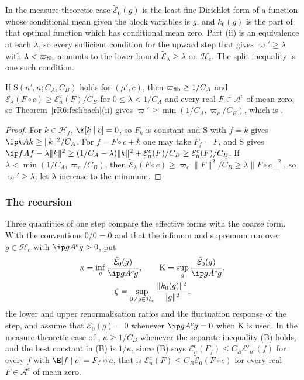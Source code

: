 In the measure-theoretic case $\tilde{\mathcal E}_0(g)$ is the least fine
Dirichlet form of a function whose conditional mean given the block
variables is $g$, and $k_0(g)$ is the part of that optimal function which
has conditional mean zero. Part (ii) is an equivalence at each $\lambda$, so
every sufficient condition for the upward step that gives $\varpi'\ge
\lambda$ with $\lambda<\varpi_{\rm fib}$ amounts to the lower bound
$\tilde{\mathcal E}_\lambda\ge\lambda$ on $\mathcal H_c$. The split
inequality is one such condition.

\begin{proposition}\label{rR6:split}
If $\mathrm S(n',n;C_A,C_B)$ holds for $(\mu',c)$, then $\varpi_{\rm fib}
\ge1/C_A$ and $\tilde{\mathcal E}_\lambda(F\circ c)\ge\mathcal E^c_n(F)/
C_B$ for $0\le\lambda<1/C_A$ and every real $F\in\mathcal A^c$ of mean zero;
so Theorem~\textup{\ref{rR6:feshbach}(ii)} gives $\varpi'\ge\min(1/C_A,
\varpi_c/C_B)$, which is \cite[Theorem~100(i)]{BBLR26}.
\end{proposition}

\begin{proof}
For $k\in\mathcal H_f$, $\E[k\mid c]=0$, so $F_k$ is constant and
$\mathrm S$ with $f=k$ gives $\ip kAk\ge\lVert k\rVert^2/C_A$. For $f=
F\circ c+k$ one may take $F_f=F$, and $\mathrm S$ gives
$\ip fAf-\lambda\lVert k\rVert^2\ge(1/C_A-\lambda)\lVert k\rVert^2+
\mathcal E^c_n(F)/C_B\ge\mathcal E^c_n(F)/C_B$. If $\lambda<\min(1/C_A,
\varpi_c/C_B)$, then $\tilde{\mathcal E}_\lambda(F\circ c)\ge\varpi_c
\lVert F\rVert^2/C_B\ge\lambda\lVert F\circ c\rVert^2$, so $\varpi'\ge
\lambda$; let $\lambda$ increase to the minimum.
\end{proof}
\subsubsection{The recursion}

Three quantities of one step compare the effective forms with the coarse
form. With the conventions $0/0=0$ and that the infimum and supremum run
over $g\in\mathcal H_c$ with $\ip g{A^cg}>0$, put
\begin{gather*}
\kappa=\inf_g\frac{\tilde{\mathcal E}_0(g)}{\ip g{A^cg}},\qquad
\mathrm K=\sup_g\frac{\tilde{\mathcal E}_0(g)}{\ip g{A^cg}},\\
\zeta=\sup_{0\ne g\in\mathcal H_c}\frac{\lVert k_0(g)\rVert^2}{\lVert g
\rVert^2},
\end{gather*}
the lower and upper renormalisation ratios and the fluctuation response of
the step, and assume that $\tilde{\mathcal E}_0(g)=0$ whenever $\ip g{A^cg}
=0$ when $\mathrm K$ is used. In the measure-theoretic case of
\cite[Sec.~X\,K]{BBLR26}, $\kappa\ge1/C_B$ whenever the separate
inequality (B) holds, and the best constant in (B) is $1/\kappa$, since (B)
says $\mathcal E^c_n(F_f)\le C_B\mathcal E'_{n'}(f)$ for every $f$ with
$\E[f\mid c]=F_f\circ c$, that is $\mathcal E^c_n(F)\le C_B\tilde
{\mathcal E}_0(F\circ c)$ for every real $F\in\mathcal A^c$ of mean
zero.

